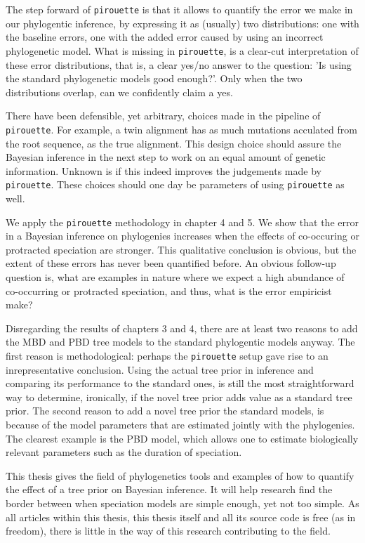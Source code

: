 The step forward of \verb;pirouette; is that it allows 
to quantify the error we make in our phylogentic inference, by
expressing it as (usually) two distributions: one with the baseline errors,
one with the added error caused by using an incorrect phylogenetic model.
What is missing in \verb;pirouette;, is a clear-cut interpretation of these 
error distributions, that is, a clear yes/no answer to the question: 'Is
using the standard phylogenetic models good enough?'. Only when the two
distributions overlap, can we confidently claim a yes. 

There have been defensible, yet arbitrary, choices made in the pipeline
of \verb;pirouette;. For example, a twin alignment has as much
mutations acculated from the root sequence, as the true alignment. 
This design choice should assure the Bayesian inference in the next step
to work on an equal amount of genetic information. Unknown is if this
indeed improves the judgements made by \verb;pirouette;. These choices
should one day be parameters of using \verb;pirouette; as well.

We apply the \verb;pirouette; methodology in chapter 4 and 5.
We show that the error in a Bayesian inference on
phylogenies increases when the effects of co-occuring 
or protracted speciation are stronger. 
This qualitative conclusion is obvious, 
but the extent of these errors has never been quantified before.
An obvious follow-up question is, 
what are examples in nature where we expect a high 
abundance of co-occurring or protracted speciation, 
and thus, what is the
error empiricist make?

Disregarding the results of chapters 3 and 4, there are
at least two reasons to add the MBD and PBD tree models to the standard
phylogentic models anyway. The first reason is methodological: perhaps
the \verb;pirouette; setup gave rise to an inrepresentative conclusion.
Using the actual tree prior in inference and comparing its performance
to the standard ones, is still the most straightforward way to determine,
ironically, if the novel tree prior adds value as a standard tree prior.
The second reason to add a novel tree prior the standard models, is
because of the model parameters that are estimated jointly with the
phylogenies. The clearest example is the PBD model, which allows one
to estimate biologically relevant parameters such as the duration of speciation.

This thesis gives the field of phylogenetics tools and examples of
how to quantify the effect of a tree prior on Bayesian inference.
It will help research find the border between when speciation models are
simple enough, yet not too simple. As all articles within this thesis,
this thesis itself and all its source code is free (as in freedom),
there is little in the way of this research contributing to the field. 

